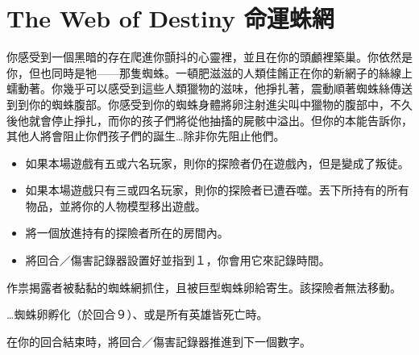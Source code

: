 
\chapter{The Web of Destiny 命運蛛網}

\begin{HauntStory}
  你感受到一個黑暗的存在爬進你顫抖的心靈裡，並且在你的頭顱裡築巢。你依然是你，但也同時是牠——那隻蜘蛛。一頓肥滋滋的人類佳餚正在你的新網子的絲線上蠕動著。你幾乎可以感受到這些人類獵物的滋味，他掙扎著，震動順著蜘蛛絲傳送到到你的蜘蛛腹部。你感受到你的蜘蛛身體將卵注射進尖叫中獵物的腹部中，不久後他就會停止掙扎，而你的孩子們將從他抽搐的屍骸中溢出。但你的本能告訴你，其他人將會阻止你們孩子們的誕生…除非你先阻止他們。
\end{HauntStory}

\vspace*{-1em}
\begin{itemize}
  \item 如果本場遊戲有五或六名玩家，則你的探險者仍在遊戲內，但是變成了叛徒。
  \item 如果本場遊戲只有三或四名玩家，則你的探險者已遭吞噬。丟下所持有的所有物品，並將你的人物模型移出遊戲。
  \item 將一個放進持有的探險者所在的房間內。
  \item 將回合／傷害記錄器設置好並指到１，你會用它來記錄時間。
\end{itemize}

作祟揭露者被黏黏的蜘蛛網抓住，且被巨型蜘蛛卵給寄生。該探險者無法移動。

…蜘蛛卵孵化（於回合９）、或是所有英雄皆死亡時。

在你的回合結束時，將回合／傷害記錄器推進到下一個數字。

\vfill\null\pagebreak


